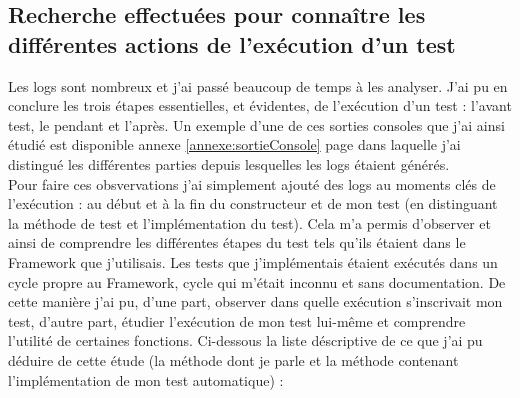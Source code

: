 \subsection{Recherche effectu\'{e}es pour conna\^{i}tre les diff\'{e}rentes actions de l'ex\'{e}cution d'un test}
Les logs sont nombreux et j'ai pass\'{e} beaucoup de temps \`{a} les analyser. J'ai pu en conclure les trois \'{e}tapes essentielles, et \'{e}videntes, de l'ex\'{e}cution d'un test : l'avant test, le pendant et l'apr\`{e}s. Un exemple d'une de ces sorties consoles que j'ai ainsi \'{e}tudi\'{e} est disponible annexe \ref{annexe:sortieConsole} page \pageref{annexe:sortieConsole} dans laquelle j'ai distingu\'{e} les diff\'{e}rentes parties depuis lesquelles les logs \'{e}taient g\'{e}n\'{e}r\'{e}s.\\
Pour faire ces obsvervations j'ai simplement ajout\'{e} des logs au moments cl\'{e}s de l'ex\'{e}cution : au d\'{e}but et \`{a} la fin du constructeur et de mon test (en distinguant la m\'{e}thode de test et l'impl\'{e}mentation du test). Cela m'a permis d'observer et ainsi de comprendre les diff\'{e}rentes \'{e}tapes du test tels qu'ils \'{e}taient dans le \gls{Framework} que j'utilisais. Les tests que j'impl\'{e}mentais \'{e}taient ex\'{e}cut\'{e}s dans un cycle propre au \gls{Framework}, cycle qui m'\'{e}tait inconnu et sans documentation. De cette mani\`{e}re j'ai pu, d'une part, observer dans quelle ex\'{e}cution s'inscrivait mon test, d'autre part, \'{e}tudier l'ex\'{e}cution de mon test lui-m\^{e}me et comprendre l'utilit\'{e} de certaines fonctions. Ci-dessous la liste d\'{e}scriptive de ce que j'ai pu d\'{e}duire de cette \'{e}tude (la m\'{e}thode  dont je parle et la m\'{e}thode contenant l'impl\'{e}mentation de mon test automatique) :

